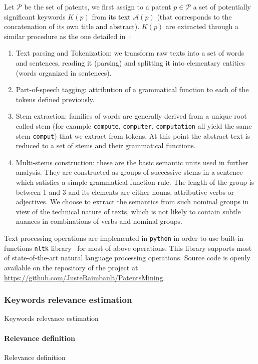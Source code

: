Let $\mathcal{P}$ be the set of patents, we first assign to a patent $p\in \mathcal{P}$ a set of potentially significant keywords $K(p)$ from its text ${\mathcal{A}}(p)$ (that corresponds to the concatenation of its own title and abstract).
$K(p)$ are extracted through a similar procedure as the one detailed in~\cite{chavalarias2013phylomemetic}: 
\begin{enumerate}
\item Text parsing and Tokenization: we transform raw texts into a set of words and sentences, reading it (parsing) and splitting it into elementary entities (words organized in sentences).

\item Part-of-speech tagging: attribution of a grammatical function to each of the tokens defined previously.

\item Stem extraction: families of words are generally derived from a unique root called stem (for example \texttt{compute}, \texttt{computer}, \texttt{computation} all yield the same stem \texttt{comput}) that we extract from tokens. At this point the abstract text is reduced to a set of stems and their grammatical functions.
\item Multi-stems construction: these are the basic semantic units used in further analysis. They are constructed as groups of successive stems in a sentence which satisfies a simple grammatical function rule. The length of the group is between 1 and 3 and its elements are either nouns, attributive verbs or adjectives. We choose to extract the semantics from such nominal groups in view of the technical nature of texts, which is not likely to contain subtle nuances in combinations of verbs and nominal groups.
\end{enumerate}

Text processing operations are implemented in \texttt{python} in order to use built-in functions \texttt{nltk} library~\cite{nltk} for most of above operations. This library supports most of state-of-the-art natural language processing operations. Source code is openly available on the repository of the project at \url{https://github.com/JusteRaimbault/PatentsMining}.

\subsubsection*{Keywords relevance estimation}{Keywords relevance estimation}
\label{keywords_est}
\paragraph{Relevance definition}{Relevance definition}

